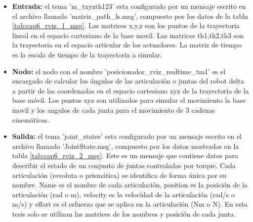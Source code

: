     \begin{itemize}
        \item {\textbf{Entrada:} el tema 'm\_txyzth123' esta configurado por un mensaje escrito en el archivo llamado 'matriz\_path\_ls.msg', compuesto por los datos de la tabla \ref{tab:cap6_rviz_1_msg}. Las matrices x,y,z son los puntos de la trayectoria lineal  en el espacio cartesiano de la base movil. Las matrices th1,th2,th3 son la trayectoria en el espacio articular de los actuadores. La matriz de tiempo es la escala de tiempo de la trayectoria a simular.}
        \item {\textbf{Nodo:} el nodo con el nombre 'posicionador\_rviz\_realtime\_tm1' es el encargado de calcular los ángulos de las articulación o juntas del robot delta a partir de las coordenadas en el espacio cartesiano xyz  de la trayectoria de la base móvil. Los puntos xyz son utilizados para simular el movimiento la base movil y los angulos de cada junta para el movimiento de 3 cadenas cinemáticas.}
        \item {\textbf{Salida:}  el tema 'joint\_states' esta configurado por un mensaje escrito en el archivo llamado 'JointState.msg', compuesto por los datos mostrados en la tabla \ref{tab:cap6_rviz_2_msg}. Este es un mensaje que contiene datos para describir el estado de un conjunto de juntas controladas por torque. Cada articulación (revoluta o prismática) se identifica de forma única por su nombre. Name es el nombre de cada articulación, position es la posición de la articulación (rad o m), velocity es la velocidad de la articulación (rad/s o m/s) y effort es el esfuerzo que se aplica en la articulación (Nm o N). En esta tesis solo se utilizan las matrices de los nombres y posición de cada junta.}
    \end{itemize} 
    

